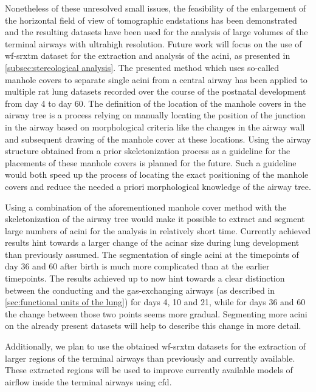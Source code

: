 Nonetheless of these unresolved small issues, the feasibility of the enlargement of the horizontal field of view of tomographic endstations has been demonstrated and the resulting datasets have been used for the analysis of large volumes of the terminal airways with ultrahigh resolution. Future work will focus on the use of \ac{wf-srxtm} dataset for the extraction and analysis of the acini, as presented in \autoref{subsec:stereological analysis}. The presented method which uses so-called manhole covers to separate single acini from a central airway has been applied to multiple rat lung datasets recorded over the course of the postnatal development from day 4 to day 60. The definition of the location of the manhole covers in the airway tree is a process relying on manually locating the position of the junction in the airway based on morphological criteria like the changes in the airway wall and subsequent drawing of the manhole cover at these locations. Using the airway structure obtained from a prior skeletonization process as a guideline for the placements of these manhole covers is planned for the future. Such a guideline would both speed up the process of locating the exact positioning of the manhole covers and reduce the needed a priori morphological knowledge of the airway tree.

Using a combination of the aforementioned manhole cover method with the skeletonization of the airway tree would make it possible to extract and segment large numbers of acini for the analysis in relatively short time. Currently achieved results hint towards a larger change of the acinar size during lung development than previously assumed. The segmentation of single acini at the timepoints of day 36 and 60 after birth is much more complicated than at the earlier timepoints. The results achieved up to now hint towards a clear distinction between the conducting and the gas-exchanging airways (as described in \autoref{sec:functional units of the lung}) for days 4, 10 and 21, while for days 36 and 60 the change between those two points seems more gradual. Segmenting more acini on the already present datasets will help to describe this change in more detail. 

Additionally, we plan to use the obtained \ac{wf-srxtm} datasets for the extraction of larger regions of the terminal airways than previously and currently available. These extracted regions will be used to improve currently available models of airflow inside the terminal airways \cite{Sznitman2007,Sznitman2009}  using \ac{cfd}. 

